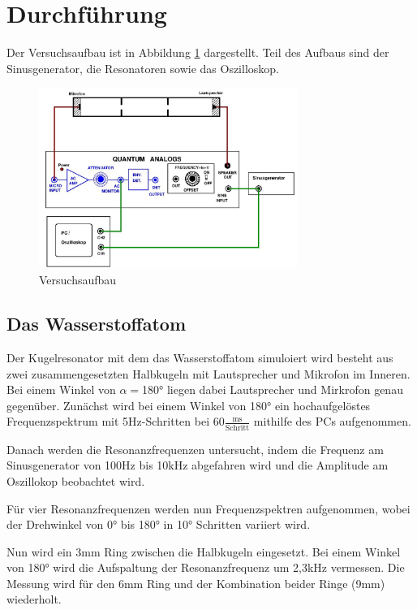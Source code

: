 \section{Durchführung}

\noindent
Der Versuchsaufbau ist in Abbildung \ref{fig:aufbau} dargestellt.
Teil des Aufbaus sind der Sinusgenerator, die Resonatoren sowie das Oszilloskop.

\begin{figure}
  \centering
  \includegraphics[width=0.75\textwidth]{V23_aufbau.png}
  \caption{Versuchsaufbau \cite{V23}}
  \label{fig:aufbau}
\end{figure}


\subsection{Das Wasserstoffatom}
\noindent
Der Kugelresonator mit dem das Wasserstoffatom simuloiert wird besteht aus zwei zusammengesetzten Halbkugeln mit Lautsprecher und Mikrofon im Inneren.
Bei einem Winkel von $\alpha=$180° liegen dabei Lautsprecher und Mirkrofon genau gegenüber.
Zunächst wird bei einem Winkel von 180° ein hochaufgelöstes Frequenzspektrum mit 5Hz-Schritten bei $60\frac{\text{ms}}{\text{Schritt}}$ mithilfe des PCs aufgenommen.

\noindent
Danach werden die Resonanzfrequenzen untersucht, indem die Frequenz am Sinusgenerator von 100Hz bis 10kHz abgefahren wird und die Amplitude am Oszillokop beobachtet wird.

\noindent
Für vier Resonanzfrequenzen werden nun Frequenzspektren aufgenommen, wobei der Drehwinkel von 0° bis 180° in 10° Schritten variiert wird.

\noindent
Nun wird ein 3mm Ring zwischen die Halbkugeln eingesetzt.
Bei einem Winkel von 180° wird die Aufspaltung der Resonanzfrequenz um 2,3kHz vermessen.
Die Messung wird für den 6mm Ring und der Kombination beider Ringe (9mm) wiederholt.

